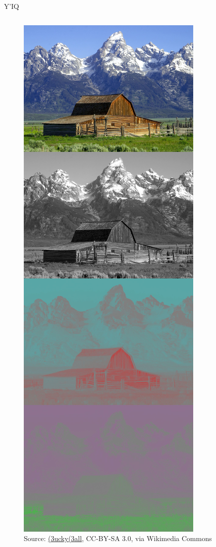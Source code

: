 \documentclass[aspectratio=169,handout,usepdftitle=false]{fireshonks}
\begin{document}
\begin{frame}{Y'IQ}
\begin{columns}
\begin{column}
\begin{figure}
                \includegraphics[height=10\baselineskip,keepaspectratio]{figures/YIQ_components.jpg}
                \caption*{Source: \href{https://commons.wikimedia.org/wiki/File:YIQ_components.jpg}{(3ucky(3all}, CC-BY-SA 3.0, via Wikimedia Commons}
            \end{figure}
        \end{column}
    \end{columns}
\end{frame}
\end{document}
